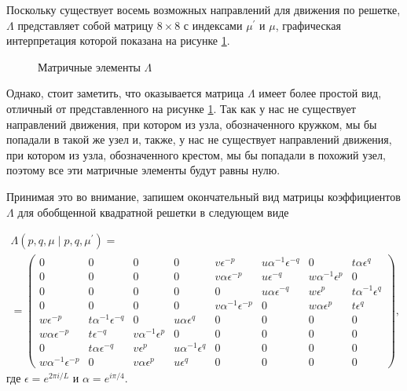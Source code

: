 Поскольку существует восемь возможных направлений для движения по решетке, $\Lambda$ представляет собой матрицу $8 \times 8$ с индексами $\mu^{'}$ и $\mu$, графическая интерпретация которой показана на рисунке \ref{matrixGen}. 

 \begin{figure}[h]
 	\caption{Матричные элементы $\Lambda$}
 	\label{matrixGen}
 \end{figure}

Однако, стоит заметить, что оказывается матрица $\Lambda$ имеет более простой вид, отличный от представленного на рисунке  \ref{matrixGen}. Так как у нас не существует направлений движения, при котором из узла, обозначенного кружком, мы бы попадали в такой же узел и, также, у нас не существует направлений движения, при котором из узла, обозначенного крестом, мы бы попадали в похожий узел, поэтому все эти матричные элементы будут равны нулю.

Принимая это во внимание, запишем окончательный вид матрицы коэффициентов $\Lambda$ для обобщенной квадратной решетки в следующем виде

\begin{multline}
\Lambda (p, q, \mu\; |\; p, q, \mu^{'}) = \\ =
\begin{pmatrix}
0 \!\!\!& 0 \!\!\!& 0 \!\!\!& 0\!\!\! & v \epsilon^{-p} \!\!\!& u \alpha^{-1} \epsilon^{-q} \!\!\!& 0 \!\!\!& t \alpha \epsilon^{q} \!\!\! \\
0 \!\!\!& 0 \!\!\!& 0 \!\!\!& 0 \!\!\!& v \alpha \epsilon^{-p}\!\!\! & u \epsilon^{-q}\!\!\! & w \alpha^{-1} \epsilon^{p}\!\!\! & 0\!\!\! \\
0 \!\!\!& 0 \!\!\!& 0 \!\!\!& 0\!\!\! & 0\!\!\! & u \alpha \epsilon^{-q} \!\!\!& w \epsilon^{p} \!\!\!& t \alpha^{-1} \epsilon^{q}\!\!\!  \\
0 \!\!\!& 0 \!\!\!& 0 \!\!\!& 0\!\!\! & v \alpha^{-1} \epsilon^{-p}\!\!\! & 0 \!\!\!& w \alpha \epsilon^{p} \!\!\!& t \epsilon^{q}\!\!\!  \\
w \epsilon^{-p} \!\!\!& t \alpha^{-1} \epsilon^{-q} \!\!\!& 0\!\!\! & u \alpha \epsilon^{q}\!\!\! & 0\!\!\! & 0\!\!\! & 0\!\!\! & 0\!\!\!  \\
w \alpha \epsilon^{-p}\!\!\! & t \epsilon^{-q} \!\!\!& v \alpha^{-1} \epsilon^{p}\!\!\! & 0 \!\!\!& 0\!\!\! & 0\!\!\! & 0\!\!\! & 0\!\!\! \\
0 \!\!\!& t \alpha \epsilon^{-q}\!\!\! & v \epsilon^{p} \!\!\!& u \alpha^{-1} \epsilon^{q}\!\!\! & 0 \!\!\!& 0\!\!\! & 0\!\!\! & 0 \!\!\! \\
w \alpha^{-1} \epsilon^{-p}\!\!\! & 0\!\!\! & v \alpha \epsilon^{p}\!\!\! & u \epsilon^{q} \!\!\!& 0\!\!\! & 0\!\!\! & 0 \!\!\!& 0 \!\!\!
\end{pmatrix},
\end{multline}
где $\epsilon = e^{2\pi i/L}$ и $\alpha = e^{i\pi/4}$.

